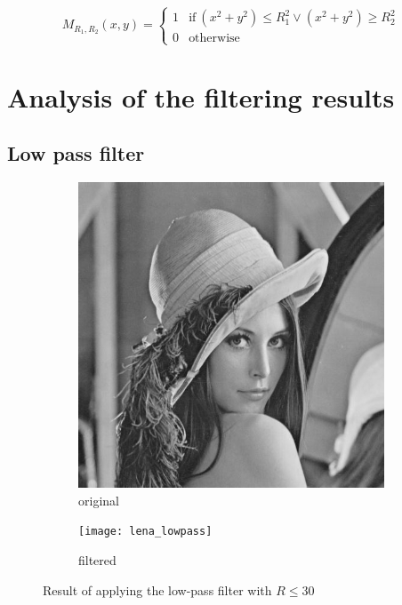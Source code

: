 \documentclass[12pt]{article}
\renewcommand*{\subfiguresize}{.35\textwidth}
\begin{document}
\begin{equation}
    M_{R_1, R_2}(x,y) = \begin{cases}
        1  &\text{if} \ (x^2 + y^2) \leq R_1^2 \lor (x^2 + y^2) \geq R_2^2  \\
        0  &\text{otherwise}
    \end{cases}
\end{equation}

\section{Analysis of the filtering results}

\subsection{Low pass filter}

\begin{figure}[H]\centering
    \begin{subfigure}[ht]{\subfiguresize}
        \includegraphics[width=\textwidth]{lena}
        \caption{original}
    \end{subfigure}
    \hspace*{2em}
    \begin{subfigure}[ht]{\subfiguresize}
        \texttt{[image: lena\_lowpass]}
        \caption{filtered}
    \end{subfigure}
    \caption{Result of applying the low-pass filter with $R \leq 30$}
\end{figure}
\end{document}
